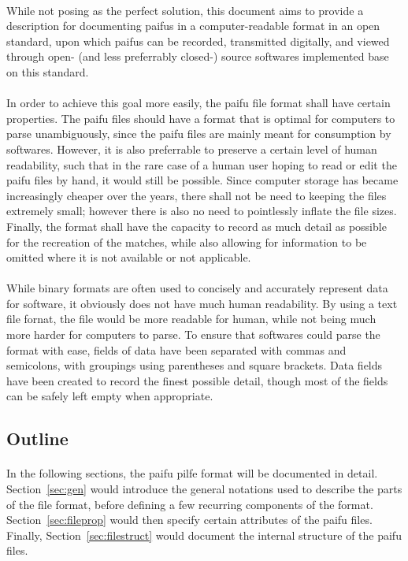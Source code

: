 \documentclass[%
	a4paper%
	,10pt%
	,twoside%
	,notitlepage%
]{article}%
\begin{document}
		\paragraph*{}While not posing as the perfect solution, this document aims to provide a description for documenting paifus in a computer-readable format in an open standard, upon which paifus can be recorded, transmitted digitally, and viewed through open- (and less preferrably closed-) source softwares implemented base on this standard. %
		\paragraph*{}In order to achieve this goal more easily, the paifu file format shall have certain properties. The paifu files should have a format that is optimal for computers to parse unambiguously, since the paifu files are mainly meant for consumption by softwares. However, it is also preferrable to preserve a certain level of human readability, such that in the rare case of a human user hoping to read or edit the paifu files by hand, it would still be possible. Since computer storage has became increasingly cheaper over the years, there shall not be need to keeping the files extremely small; however there is also no need to pointlessly inflate the file sizes. Finally, the format shall have the capacity to record as much detail as possible for the recreation of the matches, while also allowing for information to be omitted where it is not available or not applicable. %
		\paragraph*{}While binary formats are often used to concisely and accurately represent data for software, it obviously does not have much human readability. By using a text file fornat, the file would be more readable for human, while not being much more harder for computers to parse. To ensure that softwares could parse the format with ease, fields of data have been separated with commas and semicolons, with groupings using parentheses and square brackets. Data fields have been created to record the finest possible detail, though most of the fields can be safely left empty when appropriate. %
	\subsection{Outline}\label{subsec:outline}%
	\paragraph*{}In the following sections, the paifu pilfe format will be documented in detail. Section~\ref{sec:gen} would introduce the general notations used to describe the parts of the file format, before defining a few recurring components of the format. Section~\ref{sec:fileprop} would then specify certain attributes of the paifu files. Finally, Section~\ref{sec:filestruct} would document the internal structure of the paifu files. %
\end{document}
